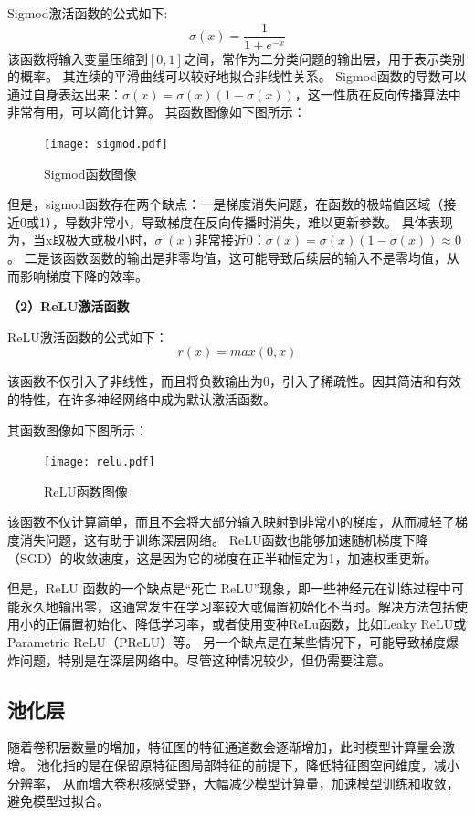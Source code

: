 Sigmod激活函数的公式如下:
\begin{equation}
	\sigma(x) = \frac{1}{1+e^{-x}}
\end{equation}
该函数将输入变量压缩到$[0,1]$之间，常作为二分类问题的输出层，用于表示类别的概率。
其连续的平滑曲线可以较好地拟合非线性关系。
Sigmod函数的导数可以通过自身表达出来：$\sigma(x)=\sigma(x)(1-\sigma(x))$，这一性质在反向传播算法中非常有用，可以简化计算。
其函数图像如下图所示：

\begin{figure}[h]
	\texttt{[image: sigmod.pdf]}
	\caption{Sigmod函数图像}
	\label{sigmod}
\end{figure}

但是，sigmod函数存在两个缺点：一是梯度消失问题，在函数的极端值区域（接近0或1），导数非常小，导致梯度在反向传播时消失，难以更新参数。
具体表现为，当x取极大或极小时，$\sigma^{'}(x)$非常接近0：$\sigma(x)=\sigma(x)(1-\sigma(x))\approx0$。
二是该函数函数的输出是非零均值，这可能导致后续层的输入不是零均值，从而影响梯度下降的效率。

\textbf{（2）ReLU激活函数}

ReLU激活函数的公式如下：
\begin{equation}
	r(x)=max(0,x)
\end{equation}

该函数不仅引入了非线性，而且将负数输出为0，引入了稀疏性。因其简洁和有效的特性，在许多神经网络中成为默认激活函数。

其函数图像如下图所示：

\begin{figure}[h]
	\texttt{[image: relu.pdf]}
	\caption{ReLU函数图像}
	\label{relu}
\end{figure}

该函数不仅计算简单，而且不会将大部分输入映射到非常小的梯度，从而减轻了梯度消失问题，这有助于训练深层网络。
ReLU函数也能够加速随机梯度下降（SGD）的收敛速度，这是因为它的梯度在正半轴恒定为1，加速权重更新。

但是，ReLU 函数的一个缺点是“死亡 ReLU”现象，即一些神经元在训练过程中可能永久地输出零，这通常发生在学习率较大或偏置初始化不当时。解决方法包括使用小的正偏置初始化、降低学习率，或者使用变种ReLu函数，比如Leaky ReLU或Parametric ReLU（PReLU）等。
另一个缺点是在某些情况下，可能导致梯度爆炸问题，特别是在深层网络中。尽管这种情况较少，但仍需要注意。


\subsection{池化层}
随着卷积层数量的增加，特征图的特征通道数会逐渐增加，此时模型计算量会激增。
池化指的是在保留原特征图局部特征的前提下，降低特征图空间维度，减小分辨率，
从而增大卷积核感受野，大幅减少模型计算量，加速模型训练和收敛，避免模型过拟合。

